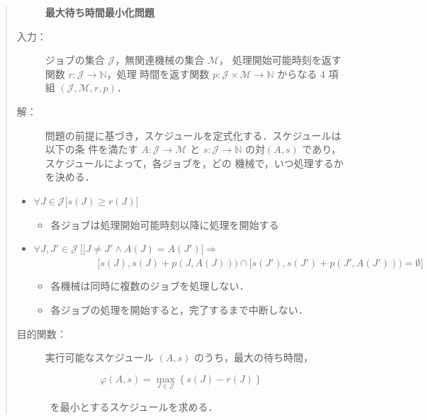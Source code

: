 \documentclass[12pt]{optlab-bachelor}
\begin{document}
\begin{quote}
  \begin{description}
    \item[] {\bf 最大待ち時間最小化問題}
    \item[入力：]
    ジョブの集合 $\mathcal{J}$，無関連機械の集合 $\mathcal{M}$，
    処理開始可能時刻を返す関数 $r : \mathcal{J} \to \mathbb{N}$，処理
    時間を返す関数 $p : \mathcal{J} \times \mathcal{M} \to \mathbb{N}$
    からなる 4 項組 $(\mathcal{J}, \mathcal{M}, r, p)$．
    \item[解：] 問題の前提に基づき，スケジュールを定式化する．スケジュールは以下の条
    件を満たす $A : \mathcal{J} \to \mathcal{M}$ と $s : \mathcal{J} \to
    \mathbb{N}$ の対$(A,s)$ であり，スケジュールによって，各ジョブを，どの
    機械で，いつ処理するかを決める．
  \end{description}

  \begin{itemize}
    \item $\forall J \in \mathcal{J}\big[s(J) \ge r(J) \big]$
    \begin{itemize}
      \item 各ジョブは処理開始可能時刻以降に処理を開始する
    \end{itemize}

    \item $\forall J, J' \in \mathcal{J}\ \Big[ \big[J\ne J' \land A(J) = A(J')\big] \Rightarrow$ \\ $~~~~~~~~~~~~~~~~~~~~~~~~~~~~~[s(J), s(J)+p(J,A(J))) \cap[s(J'), s(J')+p(J', A(J'))) = \emptyset \Big]$
    \begin{itemize}
      \item 各機械は同時に複数のジョブを処理しない．
      \item 各ジョブの処理を開始すると，完了するまで中断しない．
    \end{itemize}
  \end{itemize}

  \begin{description}
    \item[目的関数：] 実行可能なスケジュール $(A,s)$ のうち，最大の待ち時間，
  \end{description}
  \begin{displaymath}
    \varphi(A,s) = \max_{J \in \mathcal{J}} \left\{s(J) -
    r(J)\right\}
  \end{displaymath}
  \begin{description}
    \item[] ~を最小とするスケジュールを求める．
  \end{description}
\end{quote}
\end{document}
